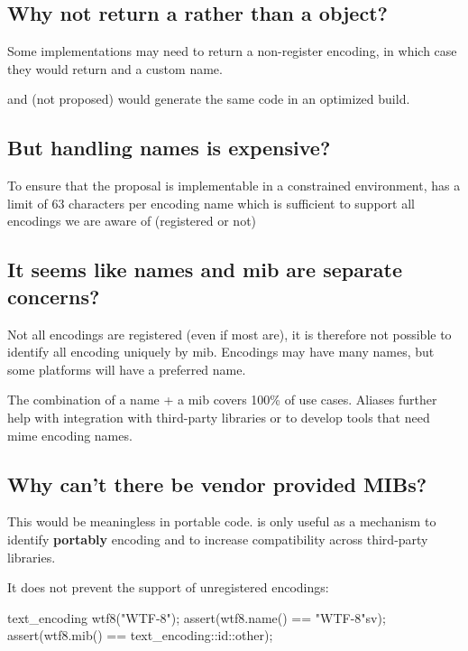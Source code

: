 \documentclass{wg21}
\begin{document}
\subsection{Why not return a  rather than a  object?}
Some implementations may need to return a non-register encoding, in which case they would return  and a custom name.

 and  (not proposed) would generate the same code in an optimized build.


\subsection{But handling names is expensive?}
To ensure that the proposal is implementable in a constrained environment,  has a limit of 63 characters per encoding name
which is sufficient to support all encodings we are aware of (registered or not)

\subsection{It seems like names and mib are separate concerns?}

Not all encodings are registered (even if most are), it is therefore not possible to identify all encoding uniquely by mib.
Encodings may have many names, but some platforms will have a preferred name.

The combination of a name + a mib covers 100\% of use cases. Aliases further help with integration with third-party libraries or to develop
tools that need mime encoding names.

\subsection{Why can't there be vendor provided MIBs?}

This would be meaningless in portable code.  is only useful as a mechanism to identify \textbf{portably} encoding and to increase compatibility across third-party libraries.

It does not prevent the support of unregistered encodings:

\begin{colorblock}
    text_encoding wtf8("WTF-8");
    assert(wtf8.name() == "WTF-8"sv);
    assert(wtf8.mib() == text_encoding::id::other);
\end{colorblock}
\end{document}

